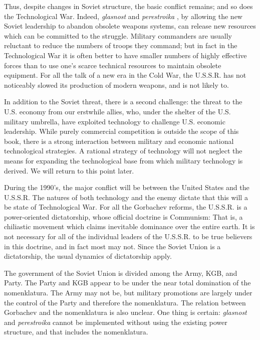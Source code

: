 Thus, despite changes in Soviet structure, the basic conflict remains; and so does the Technological War. Indeed, \textit{glasnost} and \textit{perestroika} , by allowing the new Soviet leadership to abandon obsolete weapons systems, can release new resources which can be committed to the struggle. Military commanders are usually reluctant to reduce the numbers of troops they command; but in fact in the Technological War it is often better to have smaller numbers of highly effective forces than to use one's scarce technical resources to maintain obsolete equipment. For all the talk of a new era in the Cold War, the U.S.S.R. has not noticeably slowed its production of modern weapons, and is not likely to.

In addition to the Soviet threat, there is a second challenge: the threat to the U.S. economy from our erstwhile allies, who, under the shelter of the U.S. military umbrella, have exploited technology to challenge U.S. economic leadership. While purely commercial competition is outside the scope of this book, there is a strong interaction between military and economic national technological strategies. A rational strategy of technology will not neglect the means for expanding the technological base from which military technology is derived. We will return to this point later.

During the 1990's, the major conflict will be between the United States and the U.S.S.R. The natures of both technology and the enemy dictate that this will a be state of Technological War. For all the Gorbachev reforms, the U.S.S.R. is a power-oriented dictatorship, whose official doctrine is Communism: That is, a chiliastic movement which claims inevitable dominance over the entire earth. It is not necessary for all of the individual leaders of the U.S.S.R. to be true believers in this doctrine, and in fact most may not. Since the Soviet Union is a dictatorship, the usual dynamics of dictatorship apply.

The government of the Soviet Union is divided among the Army, KGB, and Party. The Party and KGB appear to be under the near total domination of the nomenklatura. The Army may not be, but military promotions are largely under the control of the Party and therefore the nomenklatura. The relation between Gorbachev and the nomenklatura is also unclear. One thing is certain: \textit{glasnost} and \textit{perestroika} cannot be implemented without using the existing power structure, and that includes the nomenklatura.

